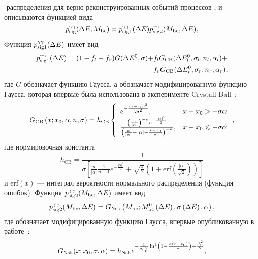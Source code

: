 \de-\mbc распределения для верно реконструированных событий процессов \bdstarpi, \bdstaretagg и \bdetap описываются функцией вида
\begin{equation}\label{eq:de_mbc_sig_gg}
 p{}_{\mathrm{sig}}^{\gamma\gamma}(\Delta E,M_{\mathrm{bc}}) = p_{\mathrm{sig}1}^{\gamma\gamma}(\Delta E)p_{\mathrm{sig}2}^{\gamma\gamma}(M_{\mathrm{bc}},\Delta E),
\end{equation}
Функция $p_{\mathrm{sig}1}^{\gamma\gamma}(\Delta E)$ имеет вид
\begin{equation}\label{eq:de_sig_pdf_gg}
\begin{split}
 p_{\mathrm{sig}1}^{\gamma\gamma}(\Delta E) = (1-f_l-f_r)G(\Delta E^0,\sigma)+&f_lG_{\mathrm{CB}}(\Delta E^0_l,\sigma_l,n_l,\alpha_l)+\\
 &f_rG_{\mathrm{CB}}(\Delta E^0_r,\sigma_r,n_r,\alpha_r),
\end{split}
\end{equation}
где $G$ обозначает функцию Гаусса, а \cbfcn обозначает модифицированную функцию Гаусса,  которая впервые была  использована в эксперименте \textrm{Crystall Ball}~\cite{crystallball}:
\begin{equation}\label{eq:CB}
 G_{\mathrm{CB}}\left(x;x_0,\alpha,n,\sigma\right) = h_{\textrm{CB}}\left\{
 \begin{array}{ll}
  e^{-\frac{\left(x-x_0\right)^2}{2\sigma^2}},&  x-x_0>-\sigma\alpha \\
  \frac{\left(\frac{n}{|\alpha|}\right)^{-n}e^{-\frac{|\alpha|^2}{2}}}{\left(\frac{n}{|\alpha|}-|\alpha|-\frac{x-x_0}{\sigma}\right)^{-n}},& x-x_0\leqslant-\sigma\alpha
 \end{array}
 \right.,
\end{equation}
где нормировочная константа
\begin{equation}\label{eq:CB_norm}
 h_{\textrm{CB}} = \frac{1}{\sigma\left[\frac{n}{|\alpha|}\frac{1}{n-1}e^{-\frac{|\alpha|^2}{2}}+\sqrt{\frac{\pi}{2}}\left(1+\textrm{erf}\left(\frac{|\alpha|}{\sqrt{2}}\right)\right)\right]}
\end{equation}
и $\textrm{erf}(x)$ --- интеграл вероятности нормального распределения (функция ошибок).  Функция $p_{\mathrm{sig}2}^{\gamma\gamma}(M_{\mathrm{bc}},\Delta E)$ имеет вид
\begin{equation}\label{eq:mbc_sig_pdf_gg}
 p_{\mathrm{sig}2}^{\gamma\gamma}(M_{\mathrm{bc}},\Delta E) = G_{\mathrm{Nsk}}\left(M_{\mathrm{bc}};M_{\mathrm{bc}}^0\left(\Delta E\right),\sigma\left(\Delta E\right),\alpha\right),
\end{equation}
где \nskfcn обозначает модифицированную функцию Гаусса, впервые опубликованную в работе~\cite{NskPDF}:
\begin{equation}\label{eq:NskPDF}
 G_{\mathrm{Nsk}}(x;x_0,\sigma,\alpha) = h_{\textrm{Nsk}}e^{-\frac{1}{2\sigma_0^2}\ln^2\left(1-\frac{\alpha\left(x-x_0\right)}{\sigma}\right)-\frac{\sigma_0^2}{2}},
\end{equation}
